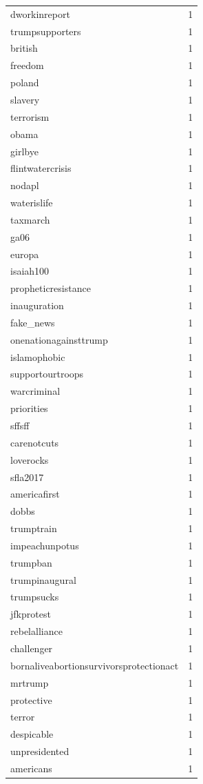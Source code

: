 \begin{tabular}{lr}
dworkinreport & 1 \\
trumpsupporters & 1 \\
british & 1 \\
freedom & 1 \\
poland & 1 \\
slavery & 1 \\
terrorism & 1 \\
obama & 1 \\
girlbye & 1 \\
flintwatercrisis & 1 \\
nodapl & 1 \\
waterislife & 1 \\
taxmarch & 1 \\
ga06 & 1 \\
europa & 1 \\
isaiah100 & 1 \\
propheticresistance & 1 \\
inauguration & 1 \\
fake\_news & 1 \\
onenationagainsttrump & 1 \\
islamophobic & 1 \\
supportourtroops & 1 \\
warcriminal & 1 \\
priorities & 1 \\
sffsff & 1 \\
carenotcuts & 1 \\
loverocks & 1 \\
sfla2017 & 1 \\
americafirst & 1 \\
dobbs & 1 \\
trumptrain & 1 \\
impeachunpotus & 1 \\
trumpban & 1 \\
trumpinaugural & 1 \\
trumpsucks & 1 \\
jfkprotest & 1 \\
rebelalliance & 1 \\
challenger & 1 \\
bornaliveabortionsurvivorsprotectionact & 1 \\
mrtrump & 1 \\
protective & 1 \\
terror & 1 \\
despicable & 1 \\
unpresidented & 1 \\
americans & 1 \\

\end{tabular}
